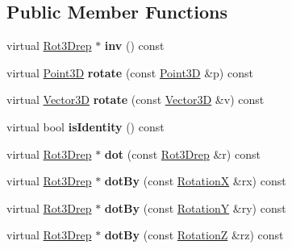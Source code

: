 \subsection*{Public Member Functions}
\begin{DoxyCompactItemize}
\item 
\mbox{\label{classIdentityRotation_a45c8543e87f123e0ad2dc489e61023d2}} 
virtual \hyperlink{classRot3Drep}{Rot3\+Drep} $\ast$ {\bfseries inv} () const
\item 
\mbox{\label{classIdentityRotation_a139e1924b9f63fac4deb517859d0a985}} 
virtual \hyperlink{classTVec3D}{Point3D} {\bfseries rotate} (const \hyperlink{classTVec3D}{Point3D} \&p) const
\item 
\mbox{\label{classIdentityRotation_ad8bcfed7e18f925f3d0b335e75db4540}} 
virtual \hyperlink{classTVec3D}{Vector3D} {\bfseries rotate} (const \hyperlink{classTVec3D}{Vector3D} \&v) const
\item 
\mbox{\label{classIdentityRotation_ac7b632c325078bc6bd7c9fbb79f1bbc1}} 
virtual bool {\bfseries is\+Identity} () const
\item 
\mbox{\label{classIdentityRotation_aa6d34c107c6ac591d8086e5c75a5ec3c}} 
virtual \hyperlink{classRot3Drep}{Rot3\+Drep} $\ast$ {\bfseries dot} (const \hyperlink{classRot3Drep}{Rot3\+Drep} \&r) const
\item 
\mbox{\label{classIdentityRotation_aeb9e3e33d49c576b624041f1cdd82748}} 
virtual \hyperlink{classRot3Drep}{Rot3\+Drep} $\ast$ {\bfseries dot\+By} (const \hyperlink{classRotationX}{RotationX} \&rx) const
\item 
\mbox{\label{classIdentityRotation_af2dfa126790966b0c3b16293708d785d}} 
virtual \hyperlink{classRot3Drep}{Rot3\+Drep} $\ast$ {\bfseries dot\+By} (const \hyperlink{classRotationY}{RotationY} \&ry) const
\item 
\mbox{\label{classIdentityRotation_a8e13fdf2134b9cc1040afa0045df820b}} 
virtual \hyperlink{classRot3Drep}{Rot3\+Drep} $\ast$ {\bfseries dot\+By} (const \hyperlink{classRotationZ}{RotationZ} \&rz) const

\end{DoxyCompactItemize}
